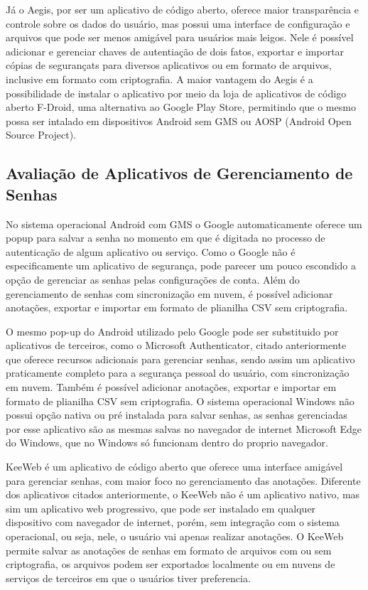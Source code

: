 \documentclass[12pt]{article}
\begin{document}
Já o Aegis, por ser um aplicativo de código aberto, oferece maior transparência
e controle sobre os dados do usuário, mas possui uma interface de configuração
e arquivos que pode ser menos amigável para usuários mais leigos.
Nele é possível adicionar e gerenciar chaves de autentiação de dois fatos,
exportar e importar cópias de segurançats para diversos aplicativos ou em formato de arquivos,
inclusive em formato com criptografia.
A maior vantagem do Aegis é a possibilidade de instalar o aplicativo por meio da
loja de aplicativos de código aberto F-Droid, uma alternativa ao Google Play
Store, permitindo que o mesmo possa ser intalado em dispositivos Android sem GMS
ou AOSP (Android Open Source Project).

\subsection{Avaliação de Aplicativos de Gerenciamento de Senhas}

No sistema operacional Android com GMS o Google automaticamente oferece um popup
para salvar a senha no momento em que é digitada no processo de autenticação de
algum aplicativo ou serviço.
Como o Google não é especificamente um aplicativo de segurança, pode parecer um
pouco escondido a opção de gerenciar as senhas pelas configurações de conta.
Além do gerenciamento de senhas com sincronização em nuvem, é possível adicionar
anotações, exportar e importar em formato de plianilha CSV sem criptografia.

O mesmo pop-up do Android utilizado pelo Google pode ser substituido por
aplicativos de terceiros, como o Microsoft Authenticator, citado anteriormente
que oferece recursos adicionais para gerenciar senhas, sendo assim um aplicativo
praticamente completo para a segurança pessoal do usuário, com sincronização em
nuvem.
Também é possível adicionar anotações, exportar e importar em formato de
plianilha CSV sem criptografia.
O sistema operacional Windows não possui opção nativa ou pré instalada para
salvar senhas, as senhas gerenciadas por esse aplicativo são as mesmas salvas no
navegador de internet Microsoft Edge do Windows, que no Windows só funcionam
dentro do proprio navegador.

KeeWeb é um aplicativo de código aberto que oferece uma interface amigável para
gerenciar senhas, com maior foco no gerenciamento das anotações.
Diferente dos aplicativos citados anteriormente, o KeeWeb não é um aplicativo
nativo, mas sim um aplicativo web progressivo, que pode ser instalado em qualquer
dispositivo com navegador de internet, porém, sem integração com o sistema
operacional, ou seja, nele, o usuário vai apenas realizar anotações.
O KeeWeb permite salvar as anotações de senhas em formato de arquivos com ou sem
criptografia, os arquivos podem ser exportados localmente ou em nuvens de
serviços de terceiros em que o usuários tiver preferencia.
\end{document}
